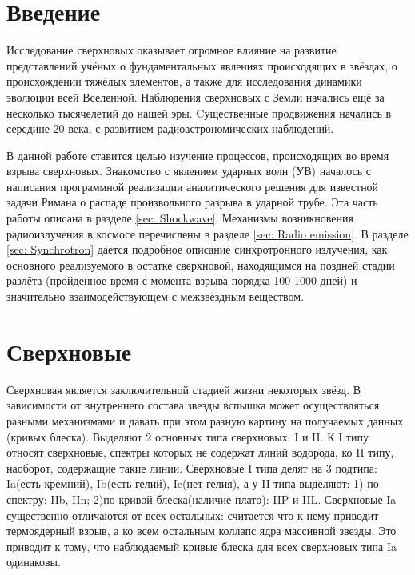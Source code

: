 \documentclass[a4paper,12pt]{extarticle}
\begin{document}
\section{Введение}
Исследование сверхновых оказывает огромное влияние на развитие представлений учёных о фундаментальных явлениях происходящих в звёздах, о происхождении тяжёлых элементов, а также для исследования динамики эволюции всей Вселенной. 
Наблюдения сверхновых с Земли начались ещё за несколько тысячелетий до нашей эры.
Cущественные продвижения начались в середине 20 века, с развитием радиоастрономических наблюдений.

В данной работе ставится целью изучение процессов, происходящих во время взрыва сверхновых.
Знакомство с явлением ударных волн (УВ) началось с написания программной реализации аналитического решения для известной задачи Римана о распаде произвольного разрыва в ударной трубе. Эта часть работы описана в разделе \ref{sec: Shockwave}.
%
Механизмы возникновения радиоизлучения в космосе перечислены в разделе \ref{sec: Radio emission}.
В разделе \ref{sec: Synchrotron} дается подробное описание синхротронного излучения, как основного реализуемого в остатке сверхновой, находящимся на поздней стадии разлёта (пройденное время с момента взрыва порядка 100-1000 дней) и значительно взаимодействующем с межзвёздным веществом. 


\section{Сверхновые}
Сверхновая является заключительной стадией жизни некоторых звёзд.{\cite{Shklov1984}} В зависимости от внутреннего состава звезды вспышка может осуществляться разными механизмами и давать при этом разную картину на получаемых данных (кривых блеска). Выделяют 2 основных типа сверхновых: I и II. К I типу относят сверхновые, спектры которых не содержат линий водорода, ко II типу, наоборот, содержащие такие линии. Сверхновые I типа делят на 3 подтипа: Ia(есть кремний), Ib(есть гелий), Ic(нет гелия), а у II типа выделяют: 1) по спектру: IIb, IIn; 2)по кривой блеска(наличие плато): IIP и IIL. 
Сверхновые Ia существенно отличаются   от всех остальных: 
считается что к нему приводит термоядерный взрыв, а ко всем остальным коллапс ядра массивной звезды. Это приводит к тому, что наблюдаемый кривые блеска для всех сверхновых типа Ia одинаковы. 
\end{document}

